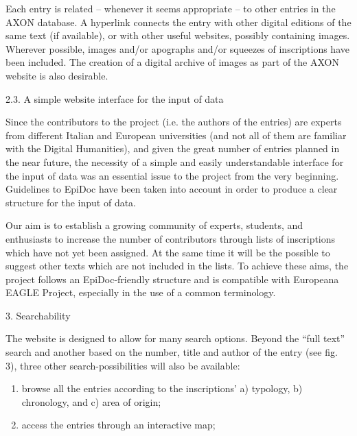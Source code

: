 \documentclass[amsthm,ebook]{saparticle}
\begin{document}
\bigskip

Each entry is related – whenever it seems appropriate – to other entries in the AXON database. A hyperlink connects the
entry with other digital editions of the same text (if available), or with other useful websites, possibly containing
images. Wherever possible, images and/or apographs and/or squeezes of inscriptions have been included. The creation of
a digital archive of images as part of the AXON website is also desirable.


\bigskip

2.3. A simple website interface for the input of data


\bigskip

Since the contributors to the project (i.e. the authors of the entries) are experts from different Italian and European
universities (and not all of them are familiar with the Digital Humanities), and given the great number of entries
planned in the near future, the necessity of a simple and easily understandable interface for the input of data was an
essential issue to the project from the very beginning. Guidelines to EpiDoc have been taken into account in order to
produce a clear structure for the input of data.

Our aim is to establish a growing community of experts, students, and enthusiasts to increase the number of contributors
through lists of inscriptions which have not yet been assigned. At the same time it will be the possible to suggest
other texts which are not included in the lists. To achieve these aims, the project follows an EpiDoc-friendly
structure and is compatible with Europeana EAGLE Project, especially in the use of a common terminology. 


\bigskip


\bigskip

3. Searchability


\bigskip

The website is designed to allow for many search options. Beyond the “full text” search and another based on the number,
title and author of the entry (see fig. 3), three other search-possibilities will also be available:

\begin{enumerate}
\item browse all the entries according to the inscriptions’ a) typology, b) chronology, and c) area of origin;
\item access the entries through an interactive map;
\end{enumerate}
\end{document}
